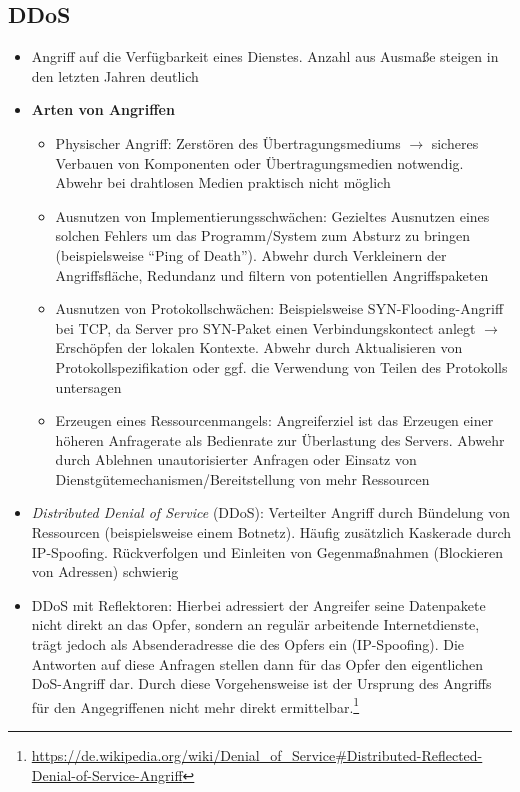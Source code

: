 \subsection{DDoS}
\begin{itemize}
	\item Angriff auf die Verfügbarkeit eines Dienstes. Anzahl aus Ausmaße steigen in den letzten Jahren deutlich
	\item \textbf{Arten von Angriffen}
	\begin{itemize}
		\item Physischer Angriff: Zerstören des Übertragungsmediums \(\rightarrow\) sicheres Verbauen von Komponenten oder Übertragungsmedien notwendig. Abwehr bei drahtlosen Medien praktisch nicht möglich
		\item Ausnutzen von Implementierungsschwächen: Gezieltes Ausnutzen eines solchen Fehlers um das Programm/System zum Absturz zu bringen (beispielsweise "`Ping of Death"'). Abwehr durch Verkleinern der Angriffsfläche, Redundanz und filtern von potentiellen Angriffspaketen
		\item Ausnutzen von Protokollschwächen: Beispielsweise SYN-Flooding-Angriff bei TCP, da Server pro SYN-Paket einen Verbindungskontect anlegt \(\rightarrow\) Erschöpfen der lokalen Kontexte. Abwehr durch Aktualisieren von Protokollspezifikation oder ggf. die Verwendung von Teilen des Protokolls untersagen
		\item Erzeugen eines Ressourcenmangels: Angreiferziel ist das Erzeugen einer höheren Anfragerate als Bedienrate zur Überlastung des Servers. Abwehr durch Ablehnen unautorisierter Anfragen oder Einsatz von Dienstgütemechanismen/Bereitstellung von mehr Ressourcen
	\end{itemize}
	\item \textit{Distributed Denial of Service} (DDoS): Verteilter Angriff durch Bündelung von Ressourcen (beispielsweise einem Botnetz). Häufig zusätzlich Kaskerade durch IP-Spoofing. Rückverfolgen und Einleiten von Gegenmaßnahmen (Blockieren von Adressen) schwierig
	\item DDoS mit Reflektoren: Hierbei adressiert der Angreifer seine Datenpakete nicht direkt an das Opfer, sondern an regulär arbeitende Internetdienste, trägt jedoch als Absenderadresse die des Opfers ein (IP-Spoofing). Die Antworten auf diese Anfragen stellen dann für das Opfer den eigentlichen DoS-Angriff dar. Durch diese Vorgehensweise ist der Ursprung des Angriffs für den Angegriffenen nicht mehr direkt ermittelbar.\footnote{\url{https://de.wikipedia.org/wiki/Denial_of_Service\#Distributed-Reflected-Denial-of-Service-Angriff}}

\end{itemize}
